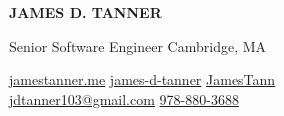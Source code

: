 \documentclass[10pt,a4paper,ragged2e,withhyper]{altacv}
\newcommand{\linkicon}[3]{#1\href{#2}{#3}}
\renewcommand{\namefont}{\Huge\rmfamily\bfseries}
\begin{document}
\begin{paracol}{2}
{\namefont\color{name}\MakeUppercase{James D. Tanner}\par}
\medskip
{\taglinefont\color{tagline}Senior Software Engineer}
\faMapMarker Cambridge, MA

\switchcolumn
\begin{flushright}
\linkicon{\faGlobe}{http://jamestanner.me}{jamestanner.me}
\linkicon{\faLinkedin}{https://linkedin.com/in/james-d-tanner}{james-d-tanner}
\linkicon{\faGithub}{https://github.com/JamesTann}{JamesTann} \\
\medskip
\linkicon{\faAt}{mailto:jdtanner103@gmail.com}{jdtanner103@gmail.com}
\linkicon{\faPhone}{tel:9788803688}{978-880-3688}
\end{flushright}

\end{paracol}
\end{document}
